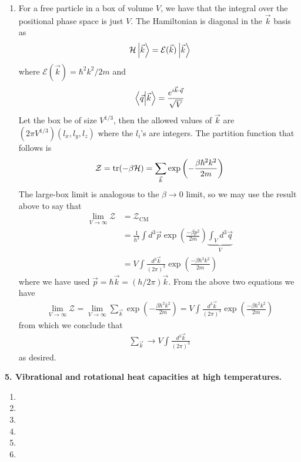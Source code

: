 \documentclass{article}
\theoremstyle{definition}
\newcommand{\ham}{\mathcal{H}}
\newcommand{\be}{\beta}
\newcommand{\f}[2]{\frac{#1}{#2}}
\newcommand{\lp}{\left(}
\newcommand{\rp}{\right)}
\begin{document}
\begin{enumerate}[label=(\alph*)]
	
	\item For a free particle in a box of volume $V$, we have that the integral over the positional phase space is just $V$. The Hamiltonian is diagonal in the $\vec{k}$ basis as
	\begin{align*}
	\ham \ket{\vec{k}} = \mathcal{E}(\vec{k}) \ket{\vec{k}} 
	\end{align*}
	where $\mathcal{E}(\vec{k}) = \hbar^2 k^2 / 2m$ and
	\begin{align*}
	\bra{\vec{q}} \ket{\vec{k}} = \f{e^{i \vec{k}\cdot \vec{q}}}{\sqrt{V}} 
	\end{align*}
	Let the box be of size $V^{1/3}$, then the allowed values of $\vec{k}$ are $(2\pi V^{1/3}) (l_x,l_y,l_z)$ where the $l_i$'s are integers. The partition function that follows is 
	\begin{align*}
	\mathcal{Z} = \tr(-\be \ham) = \sum_{\vec{k}} \exp\lp -\f{\be \hbar^2 k^2}{2m} \rp
	\end{align*}
	The large-box limit is analogous to the $\be \to 0$ limit, so we may use the result above to say that
	\begin{align*}
	\lim_{V\to \infty}\mathcal{Z} 
	&= \mathcal{Z}_\text{CM} \\
	&= \f{1}{h^3} \int d^3 \vec{p} \exp\lp \f{-\be p^2}{2m}\rp   \underbrace{{\int_V d^3\vec{q}}}_{V} \\
	&= V \int \f{ d^3 \vec{k}}{(2\pi)^3} \exp\lp \f{-\be \hbar^2 k^2}{2m} \rp
	\end{align*}
	where we have used $\vec{p} = \hbar \vec{k} = (h/2\pi) \vec{k}$. From the above two equations we have
	\begin{align*}
	\lim_{V\to \infty} \mathcal{Z}= \lim_{V\to \infty } \sum_{\vec{k}} \exp\lp -\f{\be \hbar^2 k^2}{2m} \rp = V \int \f{ d^3 \vec{k}}{(2\pi)^3} \exp\lp \f{-\be \hbar^2 k^2}{2m} \rp
	\end{align*}
	from which we conclude that
	\begin{align*}
	\sum_{\vec{k}} \to V \int \f{d^3\vec{k}}{(2\pi)^3}
	\end{align*}
	as desired. 
\end{enumerate}

\noindent \textbf{5. Vibrational and rotational heat capacities at high temperatures.}

\begin{enumerate}[label=(\alph*)]
	\item 
	\item 
	\item 
	\item 
	\item 
	\item 
\end{enumerate}
\end{document}
